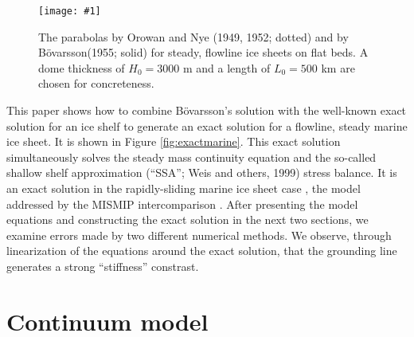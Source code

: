 \documentclass[review,letterpaper]{igs}
\renewcommand{\dh}{\fontencoding{T1}\selectfont{\symbol{240}}}
\newcommand{\onecol}[1]{\texttt{[image: \#1]}}
\newcommand{\bod}{B\"o\dh varsson\xspace}
\begin{document}
\begin{figure}[ht]
\onecol{twoparabolas}
\caption{The parabolas by Orowan and Nye (1949, 1952; dotted) and by \bod (1955; solid) for steady, flowline ice sheets on flat beds.  A dome thickness of $H_0=3000$ m and a length of $L_0=500$ km are chosen for concreteness.} \label{fig:twoparabolas}
\end{figure}

This paper shows how to combine \bod's solution with the well-known exact solution for an ice shelf \citep{vanderVeen83,vanderVeen} to generate an exact solution for a flowline, steady marine ice sheet.  It is shown in Figure \ref{fig:exactmarine}.  This exact solution simultaneously solves the steady mass continuity equation and the so-called shallow shelf approximation (``SSA''; Weis and others, 1999)\nocite{WeisGreveHutter} stress balance.  It is an exact solution in the rapidly-sliding marine ice sheet case \citep{SchoofMarine1}, the model addressed by the MISMIP intercomparison \citep{MISMIP2012}.  After presenting the model equations and constructing the exact solution in the next two sections, we examine errors made by two different numerical methods.  We observe, through linearization of the equations around the exact solution, that the grounding line generates a strong ``stiffness'' constrast.


\section{Continuum model}
\end{document}
